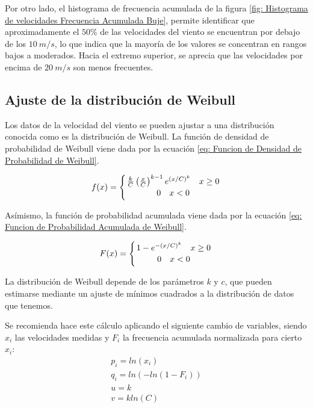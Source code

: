 \documentclass{IEEEtran}
\begin{document}
Por otro lado, el histograma de frecuencia acumulada de la figura \ref{fig: Histograma de velocidades Frecuencia Acumulada Buje}, permite identificar que aproximadamente el $50\%$ de las velocidades del viento se encuentran por debajo de los $10\ m/s$, lo que indica que la mayoría de los valores se concentran en rangos bajos a moderados. Hacia el extremo superior, se aprecia que las velocidades por encima de $20\ m/s$ son menos frecuentes. 

\subsection{Ajuste de la distribución de Weibull}

Los datos de la velocidad del viento se pueden ajustar a una distribución conocida como es la distribución de Weibull. La función de densidad de probabilidad de Weibull viene dada por la ecuación \ref{eq: Funcion de Densidad de Probabilidad de Weibull}.

\begin{equation}
    f(x) = \left\{ \frac{k}{C} \left( \frac{x}{C} \right)^{k - 1} e^{(x/C)^k} \quad x \geq 0 \atop 0 \quad x < 0 \right.
    \label{eq: Funcion de Densidad de Probabilidad de Weibull}
\end{equation}

Asímismo, la función de probabilidad acumulada viene dada por la ecuación \ref{eq: Funcion de Probabilidad Acumulada de Weibull}.

\begin{equation}
    F(x) = \left\{ 1 - e^{-(x/C)^k} \quad x \geq 0 \atop 0 \quad x < 0 \right.
    \label{eq: Funcion de Probabilidad Acumulada de Weibull}
\end{equation}

La distribución de Weibull depende de los parámetros $k$ y $c$, que pueden estimarse mediante un ajuste de mínimos cuadrados a la distribución de datos que tenemos.

Se recomienda hace este cálculo aplicando el siguiente cambio de variables, siendo $x_i$ las velocidades medidas y $F_i$ la frecuencia acumulada normalizada para cierto $x_i$:
\begin{gather*}
    p_i = ln(x_i) \\
    q_i = ln(- ln(1 - F_i)) \\
    u = k \\
    v = k ln(C)
\end{gather*}
\end{document}
